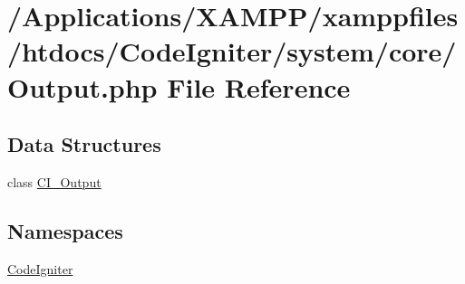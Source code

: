 \hypertarget{_output_8php}{}\section{/\+Applications/\+X\+A\+M\+P\+P/xamppfiles/htdocs/\+Code\+Igniter/system/core/\+Output.php File Reference}
\label{_output_8php}
\subsection*{Data Structures}
\begin{DoxyCompactItemize}
\item 
class \mbox{\hyperlink{class_c_i___output}{C\+I\+\_\+\+Output}}
\end{DoxyCompactItemize}
\subsection*{Namespaces}
\begin{DoxyCompactItemize}
\item 
 \mbox{\hyperlink{namespace_code_igniter}{Code\+Igniter}}
\end{DoxyCompactItemize}

